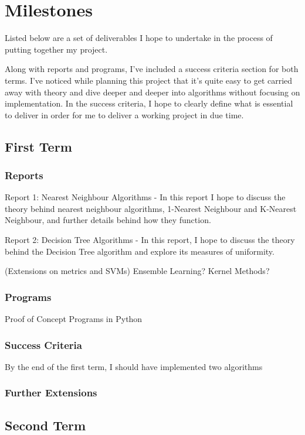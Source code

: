 \documentclass[letterpaper,11pt]{article}
\begin{document}
\newpage
\section{Milestones}
Listed below are a set of deliverables I hope to undertake in the process of putting together my project. \par 
Along with reports and programs, I've included a success criteria section for both terms. I've noticed while planning this project that it's quite easy to get carried away with theory and dive deeper and deeper into algorithms without focusing on implementation. In the success criteria, I hope to clearly define what is essential to deliver in order for me to deliver a working project in due time. 
\subsection{First Term}
\subsubsection{Reports}
Report 1: Nearest Neighbour Algorithms - In this report I hope to discuss the theory behind nearest neighbour algorithms, 1-Nearest Neighbour and K-Nearest Neighbour, and further details behind how they function. \par 
Report 2: Decision Tree Algorithms - In this report, I hope to discuss the theory behind the Decision Tree algorithm and explore its measures of uniformity. \par
(Extensions on metrics and SVMs) Ensemble Learning? Kernel Methods?

\subsubsection{Programs}
Proof of Concept Programs in Python

\subsubsection{Success Criteria}
By the end of the first term, I should have implemented two algorithms
\subsubsection{Further Extensions}


\subsection{Second Term}
\end{document}
